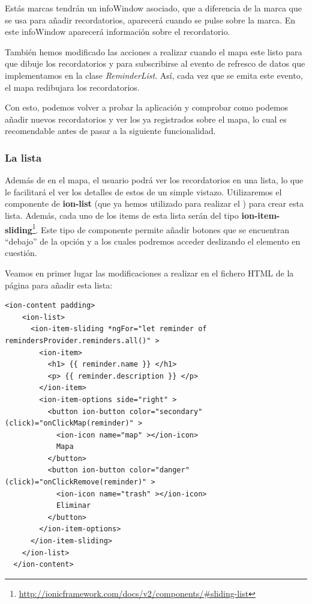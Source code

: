 Estás marcas tendrán un infoWindow asociado, que a diferencia de la marca que se usa para añadir recordatorios, aparecerá cuando se pulse sobre la marca. En este infoWindow aparecerá información sobre el recordatorio.

También hemos modificado las acciones a realizar cuando el mapa este listo para que dibuje los recordatorios y para subscribirse al evento de refresco de datos que implementamos en la clase \emph{ReminderList}. Así, cada vez que se emita este evento, el mapa redibujara los recordatorios.

Con esto, podemos volver a probar la aplicación y comprobar como podemos añadir nuevos recordatorios y ver los ya registrados sobre el mapa, lo cual es recomendable antes de pasar a la siguiente funcionalidad.

\subsubsection{La lista}

Además de en el mapa, el usuario podrá ver los recordatorios en una lista, lo que le facilitará el ver los detalles de estos de un simple vistazo. Utilizaremos el componente de \textbf{ion-list} (que ya hemos utilizado para realizar el ) para crear esta lista. Además, cada uno de los items de esta lista serán del tipo \textbf{ion-item-sliding}\footnote{\url{http://ionicframework.com/docs/v2/components/\#sliding-list}}. Este tipo de componente permite añadir botones que se encuentran ``debajo'' de la opción y a los cuales podremos acceder deslizando el elemento en cuestión.

Veamos en primer lugar las modificaciones a realizar en el fichero \gls{HTML} de la página para añadir esta lista:

\begin{lstlisting}[style=htmlcssjs,frame=tlrb,xleftmargin={0.2cm}]
  <ion-content padding>
    <ion-list>
      <ion-item-sliding *ngFor="let reminder of remindersProvider.reminders.all()" >
        <ion-item>
          <h1> {{ reminder.name }} </h1>
          <p> {{ reminder.description }} </p>
        </ion-item>
        <ion-item-options side="right" >
          <button ion-button color="secondary" (click)="onClickMap(reminder)" >
            <ion-icon name="map" ></ion-icon>
            Mapa
          </button>
          <button ion-button color="danger" (click)="onClickRemove(reminder)" >
            <ion-icon name="trash" ></ion-icon>
            Eliminar
          </button>
        </ion-item-options>
      </ion-item-sliding>
    </ion-list>
  </ion-content>
\end{lstlisting}

